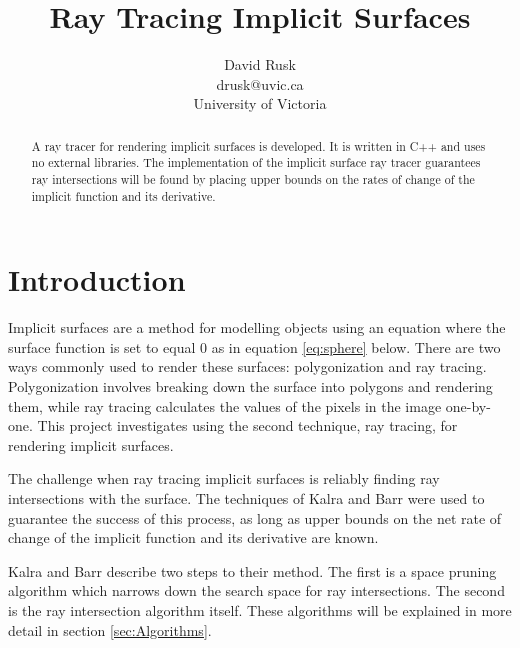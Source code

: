 \documentclass[conference]{acmsiggraph}
\title{Ray Tracing Implicit Surfaces}
\author{David Rusk\\drusk@uvic.ca\\University of Victoria}
\begin{document}
\maketitle

\begin{abstract}

A ray tracer for rendering implicit surfaces is developed.  It is
written in C++ and uses no external libraries.  The implementation of the
implicit surface ray tracer guarantees ray intersections will be found by 
placing upper bounds on the rates of change of the implicit function 
and its derivative.

\end{abstract}

\keywordlist


\TOGlinkslist



\section{Introduction}

Implicit surfaces are a method for modelling objects using an equation
where the surface function is set to equal 0 as in equation \ref{eq:sphere} 
below.  There are two ways commonly used to
render these surfaces: polygonization and ray tracing.  Polygonization
involves breaking down the surface into polygons and rendering them, 
while ray tracing calculates the values of the pixels in the image
one-by-one.  This project investigates using the second technique, 
ray tracing, for rendering implicit surfaces.

The challenge when ray tracing implicit surfaces is reliably finding
ray intersections with the surface.  The techniques of Kalra and
Barr \cite{KalraBarr1989} were used to guarantee the success of this
process, as long as upper bounds on the net rate of change of the 
implicit function and its derivative are known.  

Kalra and Barr describe two steps to their method.  The first is a
space pruning algorithm which narrows down the search space for 
ray intersections.  The second is the ray intersection algorithm 
itself.  These algorithms will be explained in more detail in section 
\ref{sec:Algorithms}.
\end{document}

